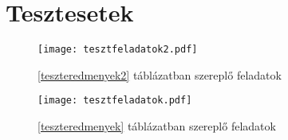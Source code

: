 \appendix
\chapter{Tesztesetek}

\begin{figure}[H]
\begin{center}
\texttt{[image: tesztfeladatok2.pdf]}
\caption{\ref{teszteredmenyek2} táblázatban szereplő feladatok}
\label{tesztfeladatok2}
\end{center}
\end{figure}

\begin{figure}[H]
\begin{center}
\texttt{[image: tesztfeladatok.pdf]}
\caption{\ref{teszteredmenyek} táblázatban szereplő feladatok}
\label{tesztfeladatok}
\end{center}
\end{figure}




